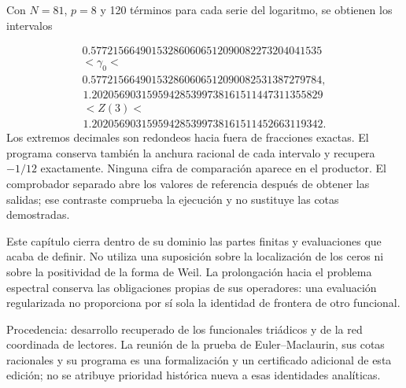 Con \(N=81\), \(p=8\) y 120 términos para cada serie del logaritmo, se obtienen los intervalos

\[
\begin{gathered}
0.577215664901532860606512090082273204041535\\
<\gamma_0<\\
0.577215664901532860606512090082531387279784,
\end{gathered}
\]
\[
\begin{gathered}
1.202056903159594285399738161511447311355829\\
<Z(3)<\\
1.202056903159594285399738161511452663119342.
\end{gathered}
\]
Los extremos decimales son redondeos hacia fuera de fracciones exactas. El programa conserva también la anchura racional de cada intervalo y recupera \(-1/12\) exactamente. Ninguna cifra de comparación aparece en el productor. El comprobador separado abre los valores de referencia después de obtener las salidas; ese contraste comprueba la ejecución y no sustituye las cotas demostradas.

Este capítulo cierra dentro de su dominio las partes finitas y evaluaciones que acaba de definir. No utiliza una suposición sobre la localización de los ceros ni sobre la positividad de la forma de Weil. La prolongación hacia el problema espectral conserva las obligaciones propias de sus operadores: una evaluación regularizada no proporciona por sí sola la identidad de frontera de otro funcional.

Procedencia: desarrollo recuperado de los funcionales triádicos y de la red coordinada de lectores. La reunión de la prueba de Euler–Maclaurin, sus cotas racionales y su programa es una formalización y un certificado adicional de esta edición; no se atribuye prioridad histórica nueva a esas identidades analíticas.
